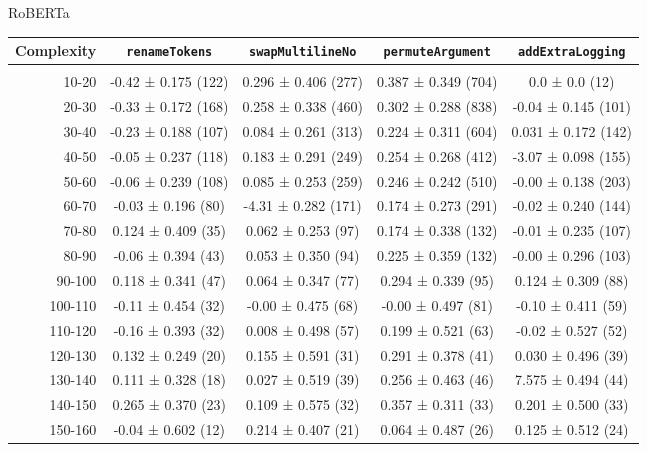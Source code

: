 \documentclass[sigconf,review,anonymous]{acmart}
\begin{document}
{    RoBERTa
    \begin{table}[H]
      \tiny
      \begin{tabular}{r|cccc}
        Complexity          & \lstinline|renameTokens|        & \lstinline|swapMultilineNo|     & \lstinline|permuteArgument|     & \lstinline|addExtraLogging|     \\\hline\\
        10-20               & -0.42 ± 0.175 (122) & 0.296 ± 0.406 (277) & 0.387 ± 0.349 (704) & 0.0 ± 0.0 (12)      \\
        20-30               & -0.33 ± 0.172 (168) & 0.258 ± 0.338 (460) & 0.302 ± 0.288 (838) & -0.04 ± 0.145 (101) \\
        30-40               & -0.23 ± 0.188 (107) & 0.084 ± 0.261 (313) & 0.224 ± 0.311 (604) & 0.031 ± 0.172 (142) \\
        40-50               & -0.05 ± 0.237 (118) & 0.183 ± 0.291 (249) & 0.254 ± 0.268 (412) & -3.07 ± 0.098 (155) \\
        50-60               & -0.06 ± 0.239 (108) & 0.085 ± 0.253 (259) & 0.246 ± 0.242 (510) & -0.00 ± 0.138 (203) \\
        60-70               & -0.03 ± 0.196 (80)  & -4.31 ± 0.282 (171) & 0.174 ± 0.273 (291) & -0.02 ± 0.240 (144) \\
        70-80               & 0.124 ± 0.409 (35)  & 0.062 ± 0.253 (97)  & 0.174 ± 0.338 (132) & -0.01 ± 0.235 (107) \\
        80-90               & -0.06 ± 0.394 (43)  & 0.053 ± 0.350 (94)  & 0.225 ± 0.359 (132) & -0.00 ± 0.296 (103) \\
        90-100              & 0.118 ± 0.341 (47)  & 0.064 ± 0.347 (77)  & 0.294 ± 0.339 (95)  & 0.124 ± 0.309 (88)  \\
        100-110             & -0.11 ± 0.454 (32)  & -0.00 ± 0.475 (68)  & -0.00 ± 0.497 (81)  & -0.10 ± 0.411 (59)  \\
        110-120             & -0.16 ± 0.393 (32)  & 0.008 ± 0.498 (57)  & 0.199 ± 0.521 (63)  & -0.02 ± 0.527 (52)  \\
        120-130             & 0.132 ± 0.249 (20)  & 0.155 ± 0.591 (31)  & 0.291 ± 0.378 (41)  & 0.030 ± 0.496 (39)  \\
        130-140             & 0.111 ± 0.328 (18)  & 0.027 ± 0.519 (39)  & 0.256 ± 0.463 (46)  & 7.575 ± 0.494 (44)  \\
        140-150             & 0.265 ± 0.370 (23)  & 0.109 ± 0.575 (32)  & 0.357 ± 0.311 (33)  & 0.201 ± 0.500 (33)  \\
        150-160             & -0.04 ± 0.602 (12)  & 0.214 ± 0.407 (21)  & 0.064 ± 0.487 (26)  & 0.125 ± 0.512 (24)  \\
      \end{tabular}
    \end{table}
  }
\end{document}
